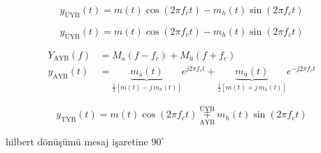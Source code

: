 \documentclass[11pt,a4paper]{article}
\begin{document}
\[ y_{\text{ÜYB}}(t) = m(t)\cos(2\pi f_c t) - m_h(t)\sin(2\pi f_c t) \]

\[ y_{\text{ÜYB}}(t) = m(t)\cos(2\pi f_c t) - m_h(t)\sin(2\pi f_c t) \]

\begin{align*}
Y_{\text{AYB}}(f) &= M_{\text{a}}(f-f_c) + M_{\text{ü}}(f+f_c)\\
y_{\text{AYB}}(t) &= \underbrace{m_{\text{a}}(t)}_{\frac12[m(t)-j\,m_h(t)]}e^{j2\pi f_c t} + \underbrace{m_{\text{ü}}(t)}_{\frac12[m(t)+j\,m_h(t)]}e^{-j2\pi f_c t}
\end{align*}

\[ y_{\text{TYB}}(t) = m(t)\cos(2\pi f_c t)\ \overset{\text{ÜYB}}{\underset{\text{AYB}}{\mp}}\ m_h(t)\sin(2\pi f_c t) \]

hilbert dönüşümü mesaj işaretine $90^\circ$ \okunamadi{}
\end{document}
